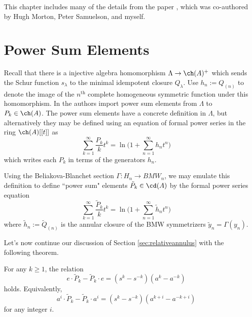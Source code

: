 This chapter includes many of the details from the paper , which was co-authored by Hugh Morton, Peter Samuelson, and myself. 




\section{Power Sum Elements} \label{sec:powersumelements}

Recall that there is a injective algebra homomorphism $\Lambda \to \ch(A)^+$ which sends the Schur function $s_\lambda$ to the minimal idempotent closure $Q_\lambda$. Use $h_n := Q_{(n)}$ to denote the image of the $n^\textrm{th}$ complete homogeneous symmetric function under this homomorphism. In  the authors import power sum elements from $\Lambda$ to $P_k \in \ch(A)$. The power sum elements have a concrete definition in $\Lambda$, but alternatively they may be defined using an equation of formal power series in the ring $\ch(A)[[t]]$ as
\begin{equation}
\sum_{k=1}^\infty \frac{P_k}{k} t^k = \ln \Bigg( 1 + \sum_{n=1}^\infty h_n t^n \Bigg)
\end{equation}
which writes each $P_k$ in terms of the generators $h_n$. 

Using the Beliakova-Blanchet section $\Gamma: H_n \to BMW_n$, we may emulate this definition to define ``power sum" elements $\tilde{P}_k \in \cd(A)$ by the formal power series equation
\begin{equation}
\sum_{k=1}^\infty \frac{\tilde{P}_k}{k} t^k = \ln \Bigg( 1 + \sum_{n=1}^\infty \tilde{h}_n t^n \Bigg)
\end{equation}
where $\tilde{h}_n := \tilde{Q}_{(n)}$ is the annular closure of the BMW symmetrizers $\tilde{y}_n = \Gamma(y_n)$.

Let's now continue our discussion of Section \ref{sec:relativeannulus} with the following theorem.

\begin{theorem} \label{thm:powersumcommutator}
For any $k \geq 1$, the relation
\begin{equation} \label{eq:powersumcommutator}
e \cdot \tilde{P}_k - \tilde{P}_k \cdot e = (s^k - s^{-k}) (a^k - a^{-k})
\end{equation}
holds. Equivalently,
\begin{equation}
a^i \cdot \tilde{P}_k - \tilde{P}_k \cdot a^i = (s^k - s^{-k}) (a^{k+i} - a^{-k+i})
\end{equation}
for any integer $i$.
\end{theorem}

